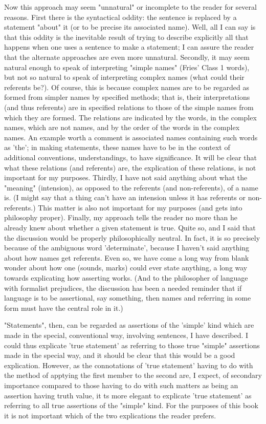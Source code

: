 \documentclass[10pt,twoside,draft]{memoir}
\begin{document}
Now this approach may seem "unnatural" or incomplete to the reader 
for several reasons. First there is the syntactical oddity: the sentence is 
replaced by a statement "about" it (or to be precise its associated name). 
Well, all I can say is that this oddity is the inevitable result of trying to 
describe explicitly all that happens when one uses a sentence to make a 
statement; I can assure the reader that the alternate approaches are even 
more unnatural. Secondly, it may seem natural enough to speak of 
interpreting "simple names" (Fries' Class 1 words), but not so natural to 
speak of interpreting complex names (what could their referents be?). Of 
course, this is because complex names are to be regarded as formed from 
simpler names by specified methods; that is, their interpretations (and thus 
referents) are in specified relations to those of the simple names from which 
they are formed. The relations are indicated by the words, in the complex 
names, which are not names, and by the order of the words in the complex 
names. An example worth a comment is associated names containing such 
words as 'the'; in making statements, these names have to be in the context 
of additional conventions, understandings, to have significance. It will be 
clear that what these relations (and referents) are, the explication of these 
relations, is not important for my purposes. Thirdly, I have not said anything 
about what the "meaning" (intension), as opposed to the referents (and 
non-referents), of a name is. (I might say that a thing can't have an intension 
unless it has referents or non-referents.) This matter is also not important for 
my purposes (and gets into philosophy proper). Finally, my approach tells 
the reader no more than he already knew about whether a given statement is 
true. Quite so, and I said that the discussion would be properly 
philosophically neutral. In fact, it is so precisely because of the ambiguous 
word 'determinate', because I haven't said anything about how names get 
referents. Even so, we have come a long way from blank wonder about how 
one (sounds, marks) could ever state anything, a long way towards 
explicating how asserting works. (And to the philosopher of language with 
formalist prejudices, the discussion has been a needed reminder that if 
language is to be assertional, say something, then names and referring in 
some form must have the central role in it.) 

"Statements", then, can be regarded as assertions of the 'simple' kind 
which are made in the special, conventional way, involving sentences, I have 
described. I could thus explicate 'true statement' as referring to those true 
"simple" assertions made in the special way, and it should be clear that this 
would be a good explication. However, as the connotations of 'true 
statement' having to do with the method of apptying the first member to the 
second are, I expect, of secondary importance compared to those having to 
do with such matters as being an assertion having truth value, it ts more 
elegant to explicate 'true statement' as referring to all true assertions of the 
"simple" kind. For the purposes of this book it is not important which of 
the two explications the reader prefers. 
\end{document}
